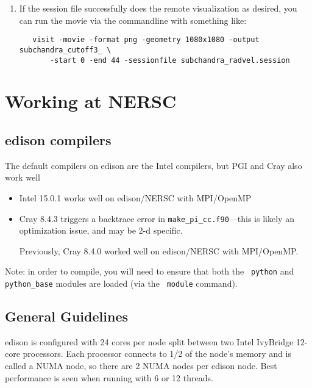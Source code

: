 \begin{itemize}
\begin{enumerate}
  \item If the session file successfully does the remote visualization
   as desired, you can run the movie via the commandline with something like:

   \begin{verbatim}
   visit -movie -format png -geometry 1080x1080 -output subchandra_cutoff3_ \
       -start 0 -end 44 -sessionfile subchandra_radvel.session
   \end{verbatim}

  \end{enumerate}

\end{itemize}


\section{Working at NERSC}

\subsection{edison compilers}

The default compilers on edison are the Intel compilers, but
PGI and Cray also work well

\begin{itemize}
\item Intel 15.0.1 works well on edison/NERSC with MPI/OpenMP

\item Cray 8.4.3 triggers a backtrace error in {\tt make\_pi\_cc.f90}---this is 
  likely an optimization issue, and may be 2-d specific.  

  Previously,  Cray 8.4.0 worked well on edison/NERSC with MPI/OpenMP.

\end{itemize}

Note: in order to compile, you will need to ensure that both the {\tt
python} and {\tt python\_base} modules are loaded (via the {\tt
module} command).

\subsection{General Guidelines}

edison is configured with 24 cores per node split between two Intel
IvyBridge 12-core processors.  Each processor connects to 1/2 of the
node's memory and is called a NUMA node, so there are 2 NUMA nodes per
edison node.  Best performance is seen when running with 6 or 12 threads.


